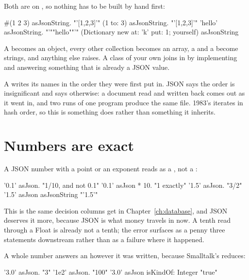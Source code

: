 Both are on , so nothing has to be built by hand first:

\begin{st}
#(1 2 3) asJsonString.                          "'[1,2,3]'"
(1 to: 3) asJsonString.                         "'[1,2,3]'"
'hello' asJsonString.                           "'""hello""'"
(Dictionary new at: 'k' put: 1; yourself) asJsonString
\end{st}

A  becomes an object, every other collection becomes an array,
a  and a  become strings, and anything else raises.
A class of your own joins in by implementing  and answering
something that is already a JSON value.

\begin{stnote}
A  writes its names in the order they were first put in. JSON
says the order is insignificant and  says otherwise: a document read
and written back comes out as it went in, and two runs of one program produce
the same file. 1983's  iterates in hash order, so this is
something  does rather than something it inherits.
\end{stnote}

\section{Numbers are exact}

A JSON number with a point or an exponent reads as a , not a
:

\begin{st}
'0.1' asJson.                   "1/10, and not 0.1"
'0.1' asJson * 10.              "1 exactly"
'1.5' asJson.                   "3/2"
'1.5' asJson asJsonString       "'1.5'"
\end{st}

This is the same decision  columns get in
Chapter~\ref{ch:database}, and JSON deserves it more, because JSON is what
money travels in now. A tenth read through a Float is already not a tenth;
the error surfaces as a penny three statements downstream rather than as a
failure where it happened.

A whole number answers an  however it was written, because
Smalltalk's  reduces:

\begin{st}
'3.0' asJson.                   "3"
'1e2' asJson.                   "100"
'3.0' asJson isKindOf: Integer  "true"
\end{st}

